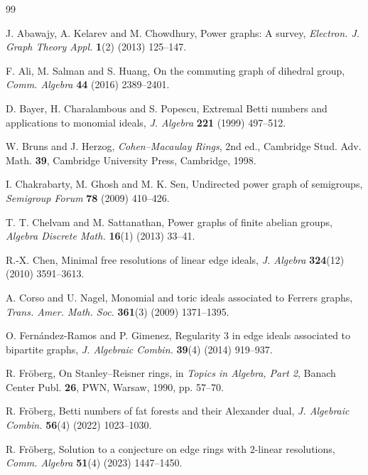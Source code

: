 \documentclass[12pt]{article}
\theoremstyle{definition}
\theoremstyle{remark}
\begin{document}
	\begin{thebibliography}{99}
		
		J. Abawajy, A. Kelarev and M. Chowdhury, Power graphs: A survey, \emph{Electron. J. Graph Theory Appl.} \textbf{1}(2) (2013) 125--147.
		
		F. Ali, M. Salman and S. Huang, On the commuting graph of dihedral group, \emph{Comm. Algebra} \textbf{44} (2016) 2389--2401.
		
		D. Bayer, H. Charalambous and S. Popescu, Extremal Betti numbers and applications to monomial ideals, \emph{J. Algebra} \textbf{221} (1999) 497--512.
		
		W. Bruns and J. Herzog, \emph{Cohen--Macaulay Rings}, 2nd ed., Cambridge Stud. Adv. Math. \textbf{39}, Cambridge University Press, Cambridge, 1998.
		
		I. Chakrabarty, M. Ghosh and M. K. Sen, Undirected power graph of semigroups, \emph{Semigroup Forum} \textbf{78} (2009) 410--426.
		
		T. T. Chelvam and M. Sattanathan, Power graphs of finite abelian groups, \emph{Algebra Discrete Math.} \textbf{16}(1) (2013) 33--41.
		
		R.-X. Chen, Minimal free resolutions of linear edge ideals, \emph{J. Algebra} \textbf{324}(12) (2010) 3591--3613.
		
		A. Corso and U. Nagel, Monomial and toric ideals associated to Ferrers graphs, \emph{Trans. Amer. Math. Soc.} \textbf{361}(3) (2009) 1371--1395.
		
		O. Fernández-Ramos and P. Gimenez, Regularity $3$ in edge ideals associated to bipartite graphs, \emph{J. Algebraic Combin.} \textbf{39}(4) (2014) 919--937.
		
		R. Fröberg, On Stanley--Reisner rings, in \emph{Topics in Algebra, Part 2}, Banach Center Publ. \textbf{26}, PWN, Warsaw, 1990, pp. 57--70.
		
		R. Fröberg, Betti numbers of fat forests and their Alexander dual, \emph{J. Algebraic Combin.} \textbf{56}(4) (2022) 1023--1030.
		
		R. Fröberg, Solution to a conjecture on edge rings with $2$-linear resolutions, \emph{Comm. Algebra} \textbf{51}(4) (2023) 1447--1450.
		

\end{thebibliography}
\end{document}
